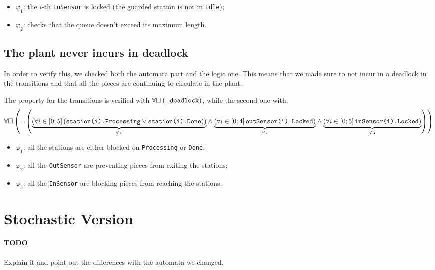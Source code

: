 \documentclass[a4paper]{article}
\newcommand{\formulacomment}[2]{\underset{\varphi_{#1}}{\underbrace{#2}}}
\newcommand{\formulatext}[1]{\text{\texttt{#1}}}
\begin{document}
    \begin{itemize}
        \item \(\varphi_1\): the \(i\)-th \texttt{InSensor} is locked (the guarded station is not in \texttt{Idle});
        \item \(\varphi_2\): checks that the queue doesn't exceed its maximum length.
    \end{itemize}

    \subsection{The plant never incurs in deadlock} \label{property:4}

    In order to verify this, we checked both the automata part and the logic one. This means that we made sure to not incur in a deadlock in the transitions and that all the pieces are continuing to circulate in the plant.\medskip

    The property for the transitions is verified with \(\forall \square \left(\neg \formulatext{deadlock}\right)\), while the second one with:
    {
        \scriptsize
        \[\forall \square \left(\neg \left(\formulacomment{1}{\left(\forall i \in \left[0; 5\right] \left(\formulatext{station(i).Processing} \vee \formulatext{station(i).Done}\right)\right)} \wedge \formulacomment{2}{\left(\forall i \in \left[0; 4\right] \formulatext{outSensor(i).Locked}\right)} \wedge \formulacomment{3}{\left(\forall i \in \left[0; 5\right] \formulatext{inSensor(i).Locked}\right)}\right)\right)\]
    }

    \begin{itemize}
        \item \(\varphi_1\): all the stations are either blocked on \texttt{Processing} or \texttt{Done};
        \item \(\varphi_2\): all the \texttt{OutSensor} are preventing pieces from exiting the stations;
        \item \(\varphi_3\): all the \texttt{InSensor} are blocking pieces from reaching the stations.
    \end{itemize}

    \section{Stochastic Version}

    \paragraph{TODO} Explain it and point out the differences with the automata we changed.
\end{document}
